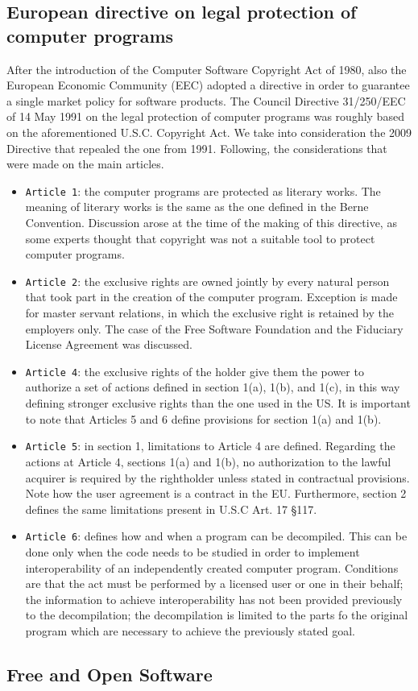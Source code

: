 \subsection*{European directive on legal protection of computer programs}

After the introduction of the Computer Software Copyright Act of 1980, also the European Economic Community (EEC) adopted a directive in order to guarantee a single market policy for software products. The Council Directive 31/250/EEC of 14 May 1991 on the legal protection of computer programs was roughly based on the aforementioned U.S.C. Copyright Act. We take into consideration the 2009 Directive that repealed the one from 1991. Following, the considerations that were made on the main articles.

\begin{itemize}
    \item \texttt{Article 1}: the computer programs are protected as literary works. The meaning of literary works is the same as the one defined in the Berne Convention. Discussion arose at the time of the making of this directive, as some experts thought that copyright was not a suitable tool to protect computer programs.
    \item \texttt{Article 2}: the exclusive rights are owned jointly by every natural person that took part in the creation of the computer program. Exception is made for master servant relations, in which the exclusive right is retained by the employers only. The case of the Free Software Foundation and the Fiduciary License Agreement was discussed.
    \item \texttt{Article 4}: the exclusive rights of the holder give them the power to authorize a set of actions defined in section 1(a), 1(b), and 1(c), in this way defining stronger exclusive rights than the one used in the US. It is important to note that Articles 5 and 6 define provisions for section 1(a) and 1(b).
    \item \texttt{Article 5}: in section 1, limitations to Article 4 are defined. Regarding the actions at Article 4, sections 1(a) and 1(b), no authorization to the lawful acquirer is required by the rightholder unless stated in contractual provisions. Note how the user agreement is a contract in the EU. Furthermore, section 2 defines the same limitations present in U.S.C Art. 17 \S 117.
    \item \texttt{Article 6}: defines how and when a program can be decompiled. This can be done only when the code needs to be studied in order to implement interoperability of an independently created computer program. Conditions are that the act must be performed by a licensed user or one in their behalf; the information to achieve interoperability has not been provided previously to the decompilation; the decompilation is limited to the parts fo the original program which are necessary to achieve the previously stated goal.
\end{itemize}

\subsection*{Free and Open Software}
